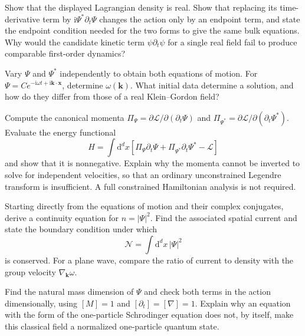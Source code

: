 \documentclass[11pt]{article}
\newcommand{\dd}{\mathrm{d}}
\newcommand{\ii}{\mathrm{i}}
\newcommand{\Lag}{\mathcal L}
\begin{document}
\begin{parts}
 \item Show that the displayed Lagrangian density is real. Show that
 replacing its time-derivative term by \(\ii\Psi^*\partial_t\Psi\)
 changes the action only by an endpoint term, and state the endpoint
 condition needed for the two forms to give the same bulk equations.
 Why would the candidate kinetic term \(\psi\partial_t\psi\) for a
 single real field fail to produce comparable first-order dynamics?

 \item Vary \(\Psi\) and \(\Psi^*\) independently to obtain both
 equations of motion. For
 \(\Psi=C e^{-\ii\omega t+\ii\bm k\cdot\bm x}\), determine
 \(\omega(\bm k)\). What initial data determine a solution, and how
 do they differ from those of a real Klein--Gordon field?

 \item Compute the canonical momenta
 \(\Pi_{\Psi}=\partial\Lag/\partial(\partial_t\Psi)\) and
 \(\Pi_{\Psi^*}=\partial\Lag/\partial(\partial_t\Psi^*)\).
 Evaluate the energy functional
 \begin{equation}
 H=\int\dd^dx\left[
 \Pi_\Psi\partial_t\Psi+
 \Pi_{\Psi^*}\partial_t\Psi^*-\Lag\right]
 \end{equation}
 and show that it is nonnegative. Explain why the momenta cannot be
 inverted to solve for independent velocities, so that an ordinary
 unconstrained Legendre transform is insufficient. A full constrained
 Hamiltonian analysis is not required.

 \item Starting directly from the equations of motion and their complex
 conjugates, derive a continuity equation for
 \(n=|\Psi|^2\). Find the associated spatial current and state the
 boundary condition under which
 \begin{equation}
 \mathcal N=\int\dd^dx\,|\Psi|^2
 \end{equation}
 is conserved. For a plane wave, compare the ratio of current to density
 with the group velocity \(\nabla_{\bm k}\omega\).

 \item Find the natural mass dimension of \(\Psi\) and check both
 terms in the action dimensionally, using \([M]=1\) and
 \([\partial_t]=[\nabla]=1\). Explain why an equation with the form of
 the one-particle Schrodinger equation does not, by itself, make this
 classical field a normalized one-particle quantum state.
\end{parts}
\end{document}

